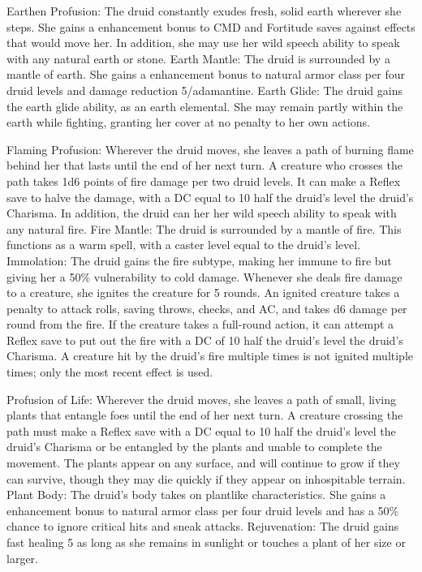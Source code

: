 \begin{greaterwildaspect}
\wilditem Earthen Profusion: The druid constantly exudes fresh, solid earth wherever she steps. She gains a  enhancement bonus to CMD and Fortitude saves against effects that would move her. In addition, she may use her wild speech ability to speak with any natural earth or stone.
\wilditem Earth Mantle: The druid is surrounded by a mantle of earth. She gains a  enhancement bonus to natural armor class per four druid levels and damage reduction 5/adamantine.
\wilditemplus Earth Glide: The druid gains the earth glide ability, as an earth elemental. She may remain partly within the earth while fighting, granting her cover at no penalty to her own actions.
\end{greaterwildaspect}

\begin{greaterwildaspect}
\wilditem Flaming Profusion: Wherever the druid moves, she leaves a path of burning flame behind her that lasts until the end of her next turn. A creature who crosses the path takes 1d6 points of fire damage per two druid levels. It can make a Reflex save to halve the damage, with a DC equal to 10 \add half the druid's level \add the druid's Charisma. In addition, the druid can her her wild speech ability to speak with any natural fire.
\wilditem Fire Mantle: The druid is surrounded by a mantle of fire. This functions as a warm  spell, with a caster level equal to the druid's level.
\wilditemplus Immolation: The druid gains the fire subtype, making her immune to fire but giving her a 50\% vulnerability to cold damage. Whenever she deals fire damage to a creature, she ignites the creature for 5 rounds. An ignited creature takes a  penalty to attack rolls, saving throws, checks, and AC, and takes d6 damage per round from the fire. If the creature takes a full-round action, it can attempt a Reflex save to put out the fire with a DC of 10 \add half the druid's level \add the druid's Charisma. A creature hit by the druid's fire multiple times is not ignited multiple times; only the most recent effect is used.
\end{greaterwildaspect}

\begin{greaterwildaspect}
\wilditem Profusion of Life: Wherever the druid moves, she leaves a path of small, living plants that entangle foes until the end of her next turn. A creature crossing the path must make a Reflex save with a DC equal to 10 \add half the druid's level \add the druid's Charisma or be entangled by the plants and unable to complete the movement. The plants appear on any surface, and will continue to grow if they can survive, though they may die quickly if they appear on inhospitable terrain.
\wilditem Plant Body: The druid's body takes on plantlike characteristics. She gains a  enhancement bonus to natural armor class per four druid levels and has a 50\% chance to ignore critical hits and sneak attacks.
\wilditemplus Rejuvenation: The druid gains fast healing 5 as long as she remains in sunlight or touches a plant of her size or larger.
\end{greaterwildaspect}


